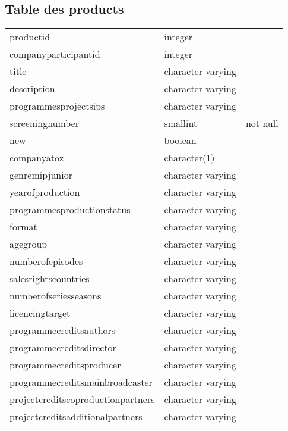 \documentclass[a4paper,11pt]{article}
\begin{document}
\subsection{Table des products}
\begin{tabular}{lll}
productid                              & integer           & \\ 
 companyparticipantid                   & integer           & \\ 
 title                                  & character varying & \\ 
 description                            & character varying & \\ 
 programmesprojectsips                  & character varying & \\ 
 screeningnumber                        & smallint          & not null \\
 new                                    & boolean           & \\ 
 companyatoz                            & character(1)      & \\ 
 genremipjunior                         & character varying & \\ 
 yearofproduction                       & character varying & \\ 
 programmesproductionstatus             & character varying & \\ 
 format                                 & character varying & \\ 
 agegroup                               & character varying & \\ 
 numberofepisodes                       & character varying & \\ 
 salesrightscountries                   & character varying & \\ 
 numberofseriesseasons                  & character varying & \\ 
 licencingtarget                        & character varying & \\ 
 programmecreditsauthors                & character varying & \\ 
 programmecreditsdirector               & character varying & \\ 
 programmecreditsproducer               & character varying & \\ 
 programmecreditsmainbroadcaster        & character varying & \\ 
 projectcreditscoproductionpartners     & character varying & \\ 
 projectcreditsadditionalpartners       & character varying & \\ 

\end{tabular}
\end{document}
